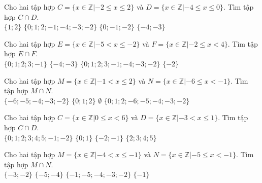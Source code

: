 \begin{ex}
 Cho hai tập hợp $C=\{x\in \mathbb{Z}|-2 \le x \le 2\}$ và $D=\{x\in \mathbb{Z}|-4 \le x \le 0\}$. Tìm tập hợp $C \cap D$.\\ 
\choice
{ $\{{1; 2}\}$ }
   { $\{{0; 1; 2; -1; -4; -3; -2}\}$ }
     { \True $\{{0; -1; -2}\}$ }
    { $\{{-4; -3}\}$ }
\end{ex}

\begin{ex}
 Cho hai tập hợp $E=\{x\in \mathbb{Z}|-5 < x \le -2\}$ và $F=\{x\in \mathbb{Z}|-2 \le x < 4\}$. Tìm tập hợp $E \cap F$.\\ 
\choice
{ $\{{0; 1; 2; 3; -1}\}$ }
   { $\{{-4; -3}\}$ }
     { $\{{0; 1; 2; 3; -1; -4; -3; -2}\}$ }
    { \True $\{{-2}\}$ }
\end{ex}

\begin{ex}
 Cho hai tập hợp $M=\{x\in \mathbb{Z}|-1 < x \le 2\}$ và $N=\{x\in \mathbb{Z}|-6 \le x < -1\}$. Tìm tập hợp $M \cap N$.\\ 
\choice
{ $\{{-6; -5; -4; -3; -2}\}$ }
   { $\{{0; 1; 2}\}$ }
     { \True $\emptyset$ }
    { $\{{0; 1; 2; -6; -5; -4; -3; -2}\}$ }
\end{ex}

\begin{ex}
 Cho hai tập hợp $C=\{x\in \mathbb{Z}|0 \le x < 6\}$ và $D=\{x\in \mathbb{Z}|-3 < x \le 1\}$. Tìm tập hợp $C \cap D$.\\ 
\choice
{ $\{{0; 1; 2; 3; 4; 5; -1; -2}\}$ }
   { \True $\{{0; 1}\}$ }
     { $\{{-2; -1}\}$ }
    { $\{{2; 3; 4; 5}\}$ }
\end{ex}

\begin{ex}
 Cho hai tập hợp $M=\{x\in \mathbb{Z}|-4 < x \le -1\}$ và $N=\{x\in \mathbb{Z}|-5 \le x < -1\}$. Tìm tập hợp $M \cap N$.\\ 
\choice
{ \True $\{{-3; -2}\}$ }
   { $\{{-5; -4}\}$ }
     { $\{{-1; -5; -4; -3; -2}\}$ }
    { $\{{-1}\}$ }
\end{ex}

